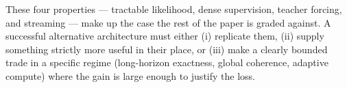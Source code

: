 These four properties --- tractable likelihood, dense supervision, teacher forcing, and streaming --- make up the case the rest of the paper is graded against.
A successful alternative architecture must either (i) replicate them, (ii) supply something strictly more useful in their place, or (iii) make a clearly bounded trade in a specific regime (long-horizon exactness, global coherence, adaptive compute) where the gain is large enough to justify the loss.
